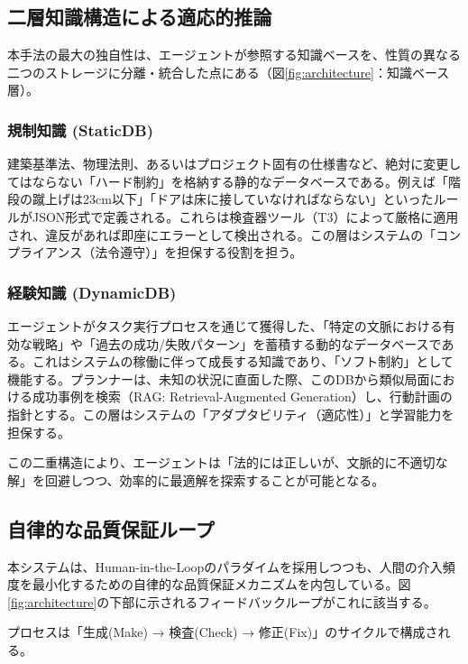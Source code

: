 \documentclass{deimj}
\begin{document}
\subsection{二層知識構造による適応的推論}

本手法の最大の独自性は、エージェントが参照する知識ベースを、性質の異なる二つのストレージに分離・統合した点にある（図\ref{fig:architecture}：知識ベース層）。

\subsubsection{規制知識 (StaticDB)}

建築基準法、物理法則、あるいはプロジェクト固有の仕様書など、絶対に変更してはならない「ハード制約」を格納する静的なデータベースである。例えば「階段の蹴上げは23cm以下」「ドアは床に接していなければならない」といったルールがJSON形式で定義される。これらは検査器ツール（T3）によって厳格に適用され、違反があれば即座にエラーとして検出される。この層はシステムの「コンプライアンス（法令遵守）」を担保する役割を担う。

\subsubsection{経験知識 (DynamicDB)}

エージェントがタスク実行プロセスを通じて獲得した、「特定の文脈における有効な戦略」や「過去の成功/失敗パターン」を蓄積する動的なデータベースである\cite{wang2023voyager}。これはシステムの稼働に伴って成長する知識であり、「ソフト制約」として機能する。プランナーは、未知の状況に直面した際、このDBから類似局面における成功事例を検索（RAG: Retrieval-Augmented Generation\cite{lewis2020rag}）し、行動計画の指針とする。この層はシステムの「アダプタビリティ（適応性）」と学習能力を担保する。

この二重構造により、エージェントは「法的には正しいが、文脈的に不適切な解」を回避しつつ、効率的に最適解を探索することが可能となる。

\subsection{自律的な品質保証ループ}

本システムは、Human-in-the-Loopのパラダイムを採用しつつも、人間の介入頻度を最小化するための自律的な品質保証メカニズムを内包している。図\ref{fig:architecture}の下部に示されるフィードバックループがこれに該当する。

プロセスは「生成(Make) → 検査(Check) → 修正(Fix)」のサイクルで構成される。
\end{document}
